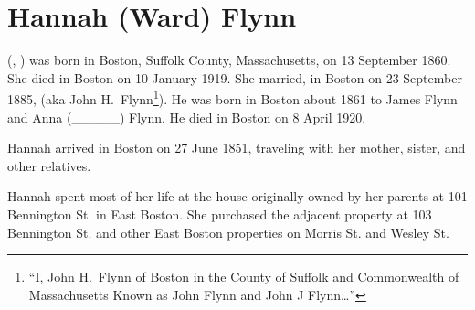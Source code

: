 \section{Hannah (Ward) Flynn}\label{per:Hannah3Ward}

 (, ) was born in Boston, Suffolk County, Massachusetts, on 13 September 1860.\cite{Hannah3WardBirth} She died in Boston on 10 January 1919.\cite{Hannah3WardDeath} She married, in Boston on 23 September 1885, \cite{Hannah3WardMarriage:1} (aka John H.\ Flynn\footnote{``I, John H.\ Flynn of Boston in the County of Suffolk and Commonwealth of Massachusetts Known as John Flynn and John J Flynn\ldots''\cite{JohnJHFlynn}}). He was born in Boston about 1861 to James Flynn and Anna (\_\_\_\_\_) Flynn.\cite{Hannah3WardMarriage:2} He died in Boston on 8 April 1920.\cite{JohnFlynnDeath:1}

Hannah arrived in Boston on 27 June 1851, traveling with her mother, sister, and other relatives.\cite{Chascay:10}

Hannah spent most of her life at the house originally owned by her parents at 101 Bennington St. in East Boston.\cite{101Bennington:2} She purchased the adjacent property at 103 Bennington St.\cite{103BenningtonSt} and other East Boston properties on Morris St.\cite{MorrisSt} and Wesley St.\cite{WesleySt}

